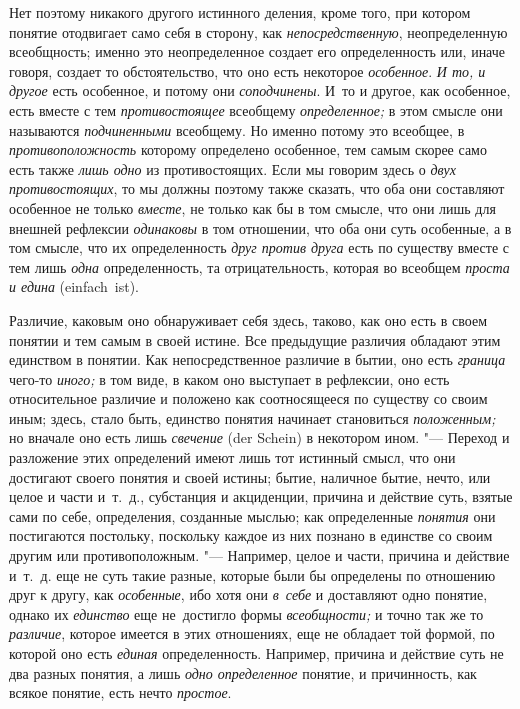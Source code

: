 \label{bkm:bm22a}Нет поэтому никакого другого истинного
деления, кроме того, при котором понятие отодвигает само себя в сторону,
как {\em непосредственную}, неопределенную всеобщность; именно это
неопределенное создает его определенность или, иначе говоря,
создает то обстоятельство, что оно есть некоторое
{\em особенное}. {\em И то, и другое} есть особенное, и потому они
{\em соподчинены}. И~то и другое, как особенное, есть вместе с тем
{\em противостоящее} всеобщему {\em определенное;} в
этом смысле они называются {\em подчиненными}
всеобщему. Но именно потому это всеобщее, в {\em противоположность}
которому определено особенное, тем самым скорее само есть
также {\em лишь одно} из противостоящих. Если мы говорим здесь о
{\em двух противостоящих},
то мы должны поэтому также сказать, что оба они составляют
особенное не только {\em вместе}, не только как бы в том смысле,
что они лишь для внешней рефлексии {\em одинаковы}
в том отношении, что оба они суть особенные, а в том смысле,
что их определенность {\em друг против
друга} есть по существу вместе с тем лишь {\em одна}
определенность, та отрицательность, которая во всеобщем
{\em проста и едина} (einfach~ist).

Различие, каковым оно обнаруживает себя здесь, таково, как оно
есть в своем понятии и тем самым в своей истине. Все предыдущие различия
обладают этим единством в
понятии. Как непосредственное
различие в бытии, оно есть {\em граница} чего-то {\em иного;} в том
виде, в каком оно выступает в рефлексии, оно есть относительное различие и
положено как соотносящееся по существу со своим иным; здесь, стало быть,
единство понятия начинает становиться {\em положенным;} но вначале оно есть
лишь {\em свечение} (der Schein) в некотором ином. "--- Переход и
разложение этих определений имеют лишь тот истинный смысл, что они
достигают своего понятия и своей истины; бытие, наличное бытие, нечто, или
целое и части и~т.~д., субстанция и акциденции, причина и действие суть,
взятые сами по себе, определения, созданные мыслью; как определенные
{\em понятия} они
постигаются постольку, поскольку каждое из них познано в единстве со своим
другим или противоположным. "--- Например, целое и части,
причина и действие и~т.~д. еще не суть такие разные, которые были бы
определены по отношению друг к другу, как {\em особенные}, ибо хотя они
{\em в~себе} и доставляют одно понятие, однако их {\em единство} еще
не~достигло формы {\em всеобщности;} и точно так же то {\em различие}, которое
имеется в этих отношениях, еще не обладает той формой, по которой оно есть
{\em единая} определенность. Например, причина и действие суть не два разных
понятия, а лишь {\em одно определенное} понятие, и причинность, как всякое
понятие, есть нечто {\em простое}.

